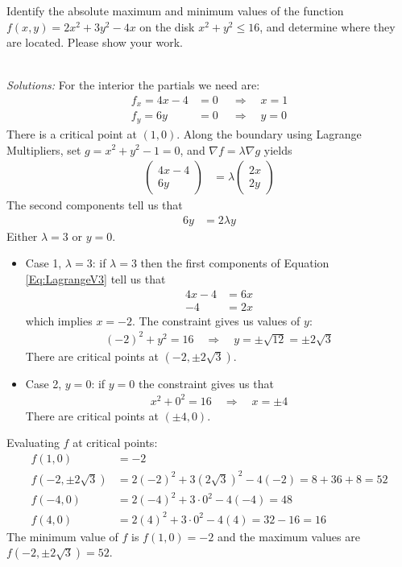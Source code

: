 \ifnum {}
\question[6] Identify the absolute maximum and minimum values of the function $f(x,y) = 2x^2 + 3y^2 - 4x$ on the disk $x^2+y^2 \le 16$, and determine where they are located. Please show your work. 
\ifnum {} {\color{DarkBlue} \\ \textit{Solutions:} For the interior the partials we need are: 
\begin{align*}
    f_x = 4x-4 &=0 \ \quad \Rightarrow \quad x= 1 \\
    f_y = 6y &=0 \ \quad \Rightarrow \quad y= 0 
\end{align*}
There is a critical point at $(1,0)$. Along the boundary using Lagrange Multipliers, set $g = x^2 + y^2 -1 = 0$, and $\nabla f = \lambda \nabla g$ yields
\begin{align}\label{Eq:LagrangeV3}
        \begin{pmatrix} 4x - 4 \\ 6y \end{pmatrix} 
        &= \lambda \begin{pmatrix} 2x\\2y \end{pmatrix} 
    \end{align}
    The second components tell us that
    \begin{align}
        6y &= 2\lambda y
    \end{align}
    Either $\lambda =3$ or $y=0$. 
    \begin{itemize}
        \item Case 1, $\lambda =3$: if $\lambda =3$ then the first components of Equation \ref{Eq:LagrangeV3} tell us that \begin{align}
            4x-4 &= 6x \\
            -4 &= 2x 
        \end{align} which implies $x = -2$. The constraint gives us values of $y$: 
        \begin{align}
            (-2)^2 + y^2 = 16 \quad \Rightarrow \quad y= \pm \sqrt{12} = \pm 2\sqrt{3}
        \end{align}
        There are critical points at $(-2,\pm2\sqrt3)$.
        \item Case 2, $y=0$: if $y=0$ the constraint gives us that 
        \begin{align}
            x^2 + 0^2 = 16 \quad \Rightarrow \quad x = \pm 4
        \end{align}
        There are critical points at $(\pm4,0)$. 
    \end{itemize}
    Evaluating $f$ at critical points: 
    \begin{align}
        f(1,0) &= -2 \\
        f(-2,\pm2\sqrt3) &= 2(-2)^2 +3(2\sqrt3)^2 - 4(-2) = 8 + 36  + 8 = 52 \\
        f(-4,0) &= 2(-4)^2 + 3\cdot 0^2 -4 (-4) = 48 \\
        f(4,0) &= 2(4)^2 + 3\cdot 0^2 -4 (4) = 32 - 16 = 16
    \end{align}
    The minimum value of $f$ is $f(1,0)=-2$ and the maximum values are $f(-2,\pm2\sqrt3) = 52$. 
    } 
   \else
      
